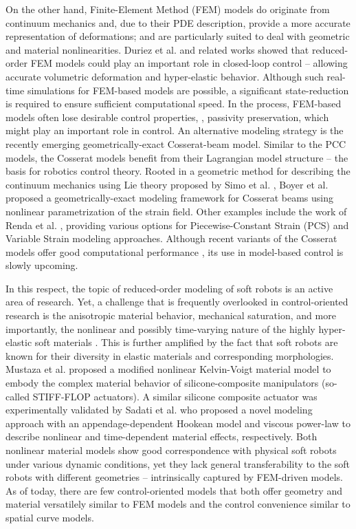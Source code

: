 On the other hand, Finite-Element Method (FEM) models do originate from continuum mechanics and, due to their PDE description, provide a more accurate representation of deformations; and are particularly suited to deal with geometric and material nonlinearities. Duriez et al.\cite{Duriez2013} and related works \cite{Coevoet2017,Largilliere2015,Goury2018} showed that reduced-order FEM models could play an important role in closed-loop control -- allowing accurate volumetric deformation and hyper-elastic behavior. Although such real-time simulations for FEM-based models are possible, a significant state-reduction is required to ensure sufficient computational speed. In the process, FEM-based models often lose desirable control properties, \eg, passivity preservation, which might play an important role in control. An alternative modeling strategy is the recently emerging geometrically-exact Cosserat-beam model. Similar to the PCC models, the Cosserat models benefit from their Lagrangian model structure  -- the basis for robotics control theory. Rooted in a geometric method for describing the continuum mechanics using Lie theory proposed by Simo et al. \cite{Simo1986}, Boyer et al. \cite{Boyer2010, Boyer2021} proposed a geometrically-exact modeling framework for Cosserat beams using nonlinear parametrization of the strain field. Other examples include the work of Renda et al. \cite{Renda2018,Renda2020}, providing various options for Piecewise-Constant Strain (PCS) and Variable Strain modeling approaches. Although recent variants of the Cosserat models offer good computational performance \cite{Till2019,Grazioso2019}, its use in model-based control is slowly upcoming.

In this respect, the topic of reduced-order modeling of soft robots is an active area of research. Yet, a challenge that is frequently overlooked in control-oriented research is the anisotropic material behavior, mechanical saturation, and more importantly, the nonlinear and possibly time-varying nature of the highly hyper-elastic soft materials \cite{Falkenhahn2015, Mochiyama2003, Till2019, Tatlicioglu2007}. This is further amplified by the fact that soft robots are known for their diversity in elastic materials and corresponding morphologies. Mustaza et al. \cite{Mustaza2019} proposed a modified nonlinear Kelvin-Voigt material model to embody the complex material behavior of silicone-composite manipulators (so-called STIFF-FLOP actuators). A similar silicone composite actuator was experimentally validated by Sadati et al.\cite{Sadati2020} who proposed a novel modeling approach with an appendage-dependent Hookean model and viscous power-law to describe nonlinear and time-dependent material effects, respectively. Both nonlinear material models show good correspondence with physical soft robots under various dynamic conditions, yet they lack general transferability to the soft robots with different geometries -- intrinsically captured by FEM-driven models. As of today, there are few control-oriented models that both offer geometry and material versatilely similar to FEM models and the control convenience similar to spatial curve models.

